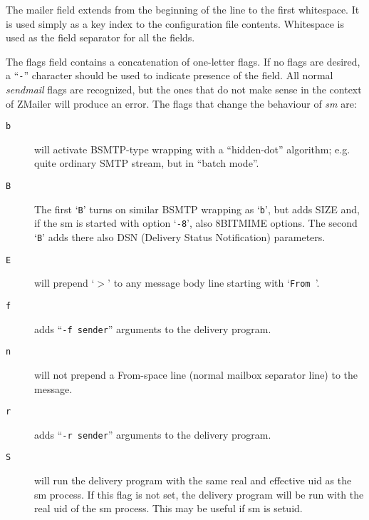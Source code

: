 The mailer field extends from the beginning of the line to
the first whitespace.  It is used simply as a key index to
the configuration  file  contents.  Whitespace is used as
the field separator for all the fields.

The flags field contains  a  concatenation  of  one-letter
flags.  If no flags are desired, a ``{\tt -}'' character should be
used to indicate presence of the field.
All normal {\em sendmail} flags are recognized, but the ones that
do not make sense in the context of ZMailer will produce an error.
The flags that change the behaviour of {\em sm} are:

\begin{description}
\item[ {\tt b}] \mbox{}

will activate BSMTP-type wrapping with a ``hidden-dot''
algorithm; e.g. quite ordinary SMTP stream, but in ``batch mode''.



\item[ {\tt B}] \mbox{}

The  first `{\tt B}'  turns on similar BSMTP wrapping as
`{\tt b}', but adds SIZE and, if the sm is  started  with
option `{\tt -8}', also 8BITMIME options.  The second `{\tt B}'
adds there also DSN (Delivery Status  Notification) parameters.



\item[ {\tt E}] \mbox{}

will prepend `{\(>\)}' to any message body line starting
with `{\tt From }'.



\item[ {\tt f}] \mbox{}

adds ``{\tt -f sender}'' arguments to the delivery program.



\item[ {\tt n}] \mbox{}

will not prepend a From-space line (normal mailbox
separator line) to the message.



\item[ {\tt r}] \mbox{}

adds ``{\tt -r sender}'' arguments to the delivery program.



\item[ {\tt S}] \mbox{}

will run the delivery program with the same real
and effective uid as the sm process.  If this  flag
is  not  set, the delivery program will be run with
the real uid of the sm process. This may be useful if sm is setuid.



\end{description}
